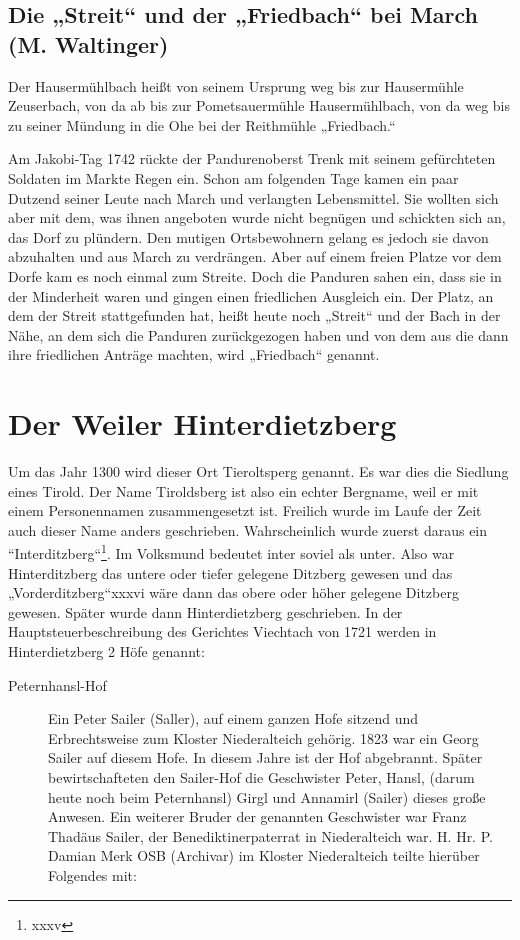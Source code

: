 \documentclass{book}
\begin{document}
\subsection{Die „Streit“ und der „Friedbach“ bei March (M. Waltinger)}

Der Hausermühlbach heißt von seinem Ursprung weg bis zur Hausermühle
Zeuserbach, von da ab bis zur Pometsauermühle Hausermühlbach, von da weg
bis zu seiner Mündung in die Ohe bei der Reithmühle „Friedbach.“

Am Jakobi-Tag 1742 rückte der Pandurenoberst Trenk mit seinem
gefürchteten Soldaten im Markte Regen ein. Schon am folgenden Tage kamen
ein paar Dutzend seiner Leute nach March und verlangten Lebensmittel.
Sie wollten sich aber mit dem, was ihnen angeboten wurde nicht begnügen
und schickten sich an, das Dorf zu plündern. Den mutigen Ortsbewohnern
gelang es jedoch sie davon abzuhalten und aus March zu verdrängen. Aber
auf einem freien Platze vor dem Dorfe kam es noch einmal zum Streite.
Doch die Panduren sahen ein, dass sie in der Minderheit waren und gingen
einen friedlichen Ausgleich ein. Der Platz, an dem der Streit
stattgefunden hat, heißt heute noch „Streit“ und der Bach in der Nähe,
an dem sich die Panduren zurückgezogen haben und von dem aus die dann
ihre friedlichen Anträge machten, wird „Friedbach“ genannt.

\section{Der Weiler Hinterdietzberg}

Um das Jahr 1300 wird dieser Ort Tieroltsperg genannt. Es war dies die
Siedlung eines Tirold. Der Name Tiroldsberg ist also ein echter
Bergname, weil er mit einem Personennamen zusammengesetzt ist. Freilich
wurde im Laufe der Zeit auch dieser Name anders geschrieben.
Wahrscheinlich wurde zuerst daraus ein “Interditzberg“\footnote{xxxv}.
Im Volksmund bedeutet inter soviel als unter. Also war Hinterditzberg
das untere oder tiefer gelegene Ditzberg gewesen und das
„Vorderditzberg“xxxvi wäre dann das obere oder höher gelegene Ditzberg
gewesen. Später wurde dann Hinterdietzberg geschrieben. In der
Hauptsteuerbeschreibung des Gerichtes Viechtach von 1721 werden in
Hinterdietzberg 2 Höfe genannt:

\begin{description}
\item[Peternhansl-Hof] Ein Peter Sailer (Saller), auf einem ganzen Hofe
sitzend und Erbrechtsweise zum Kloster Niederalteich gehörig. 1823 war
ein Georg Sailer auf diesem Hofe. In diesem Jahre ist der Hof
abgebrannt. Später bewirtschafteten den Sailer-Hof die Geschwister
Peter, Hansl, (darum heute noch beim Peternhansl) Girgl und Annamirl
(Sailer) dieses große Anwesen. Ein weiterer Bruder der genannten
Geschwister war Franz Thadäus Sailer, der Benediktinerpaterrat in
Niederalteich war. H. Hr. P. Damian Merk OSB (Archivar) im Kloster
Niederalteich teilte hierüber Folgendes mit:
\end{description}
\end{document}
